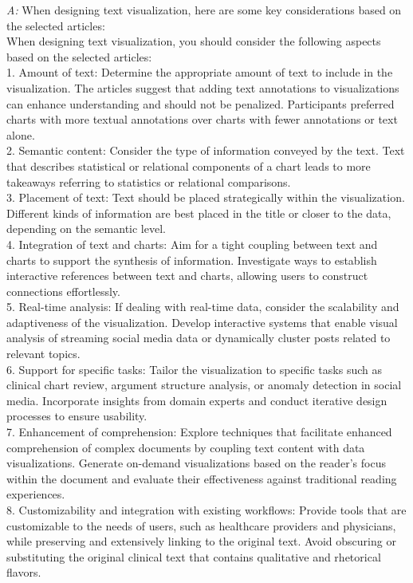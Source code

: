 \textit{A: }
When designing text visualization, here are some key considerations based on the selected articles:\\
When designing text visualization, you should consider the following aspects based on the selected articles: \\
1. Amount of text: Determine the appropriate amount of text to include in the visualization. The articles suggest that adding text annotations to visualizations can enhance understanding and should not be penalized. Participants preferred charts with more textual annotations over charts with fewer annotations or text alone. \\
2. Semantic content: Consider the type of information conveyed by the text. Text that describes statistical or relational components of a chart leads to more takeaways referring to statistics or relational comparisons. \\
3. Placement of text: Text should be placed strategically within the visualization. Different kinds of information are best placed in the title or closer to the data, depending on the semantic level. \\
4. Integration of text and charts: Aim for a tight coupling between text and charts to support the synthesis of information. Investigate ways to establish interactive references between text and charts, allowing users to construct connections effortlessly. \\
5. Real-time analysis: If dealing with real-time data, consider the scalability and adaptiveness of the visualization. Develop interactive systems that enable visual analysis of streaming social media data or dynamically cluster posts related to relevant topics. \\
6. Support for specific tasks: Tailor the visualization to specific tasks such as clinical chart review, argument structure analysis, or anomaly detection in social media. Incorporate insights from domain experts and conduct iterative design processes to ensure usability. \\
7. Enhancement of comprehension: Explore techniques that facilitate enhanced comprehension of complex documents by coupling text content with data visualizations. Generate on-demand visualizations based on the reader's focus within the document and evaluate their effectiveness against traditional reading experiences. \\
8. Customizability and integration with existing workflows: Provide tools that are customizable to the needs of users, such as healthcare providers and physicians, while preserving and extensively linking to the original text. Avoid obscuring or substituting the original clinical text that contains qualitative and rhetorical flavors. \\
